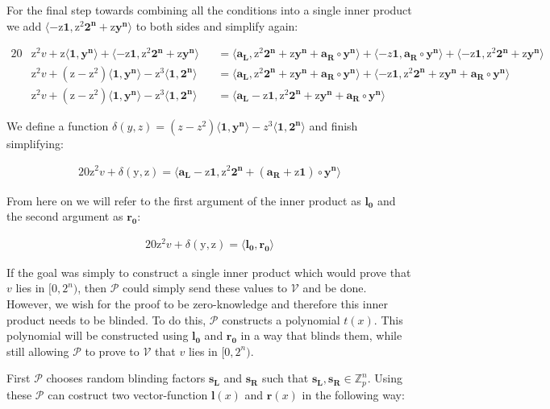 \documentclass{article}
\newcommand{\eq}[1]{\begin{alignat*}{20}#1\end{alignat*}}
\renewcommand{\vec}[1]{\boldsymbol{#1}}
\newcommand{\ran}[1]{\mathrm{#1}}
\newcommand{\vecran}[1]{\mathbf{#1}}
\newcommand{\V}{\mathcal{V}}
\renewcommand{\P}{\mathcal{P}}
\newcommand{\Z}{\mathbb{Z}}
\newcommand{\dotp}[2]{\langle #1, #2 \rangle}
\newcommand{\opn}[1]{\operatorname{#1}}
\newcommand{\vecl}[1]{\vec{#1_{\opn{L}}}}
\newcommand{\vecr}[1]{\vec{#1_{\opn{R}}}}
\begin{document}
For the final step towards combining all the conditions into a single
inner product we add $\dotp{-\ran{z}\vec{1}}{\ran{z^2}\vec{2^n} +
\ran{z}\vecran{y^n}}$ to both sides and simplify again:

\eq{
	&\ran{z^2}v + \ran{z}\dotp{\vec{1}}{\vecran{y^n}} + \dotp{-\ran{z}\vec{1}}{\ran{z^2}\vec{2^n} + \ran{z}\vecran{y^n}}
	&&= \dotp{\vecl{a}}{\ran{z^2}\vec{2^n} + \ran{z}\vecran{y^n} + \vecr{a}\circ \vecran{y^n}} +
	\dotp{-z\vec{1}}{\vecr{a}\circ\vecran{y^n}} + \dotp{-\ran{z}\vec{1}}{\ran{z^2}\vec{2^n} + \ran{z}\vecran{y^n}} \\ 
	&\ran{z^2}v + (\ran{z} - \ran{z^2})\dotp{\vec{1}}{\vecran{y^n}} - \ran{z^3}\dotp{\vec{1}}{\vec{2^n}} &&= \dotp{\vecl{a}}{\ran{z^2}\vec{2^n} + \ran{z}\vecran{y^n} + \vecr{a}\circ \vecran{y^n}} + \dotp{-\ran{z}\vec{1}}{\ran{z^2}\vec{2^n}+\ran{z}\vecran{y^n} + \vecr{a}\circ\vecran{y^n}}
	\\
	&\ran{z^2}v + (\ran{z} - \ran{z^2})\dotp{\vec{1}}{\vecran{y^n}} - \ran{z^3}\dotp{\vec{1}}{\vec{2^n}} &&= \dotp{\vecl{a}- \ran{z}\vec{1}}{\ran{z^2}\vec{2^n} + \ran{z}\vecran{y^n} + \vecr{a}\circ \vecran{y^n}}
}

We define a function $\delta(y,z) = (z - z^2)\dotp{\vec{1}}{\vec{y^n}}
- z^3\dotp{\vec{1}}{\vec{2^n}}$ and finish simplifying:

\eq{
	\ran{z^2}v + \delta(\ran{y},\ran{z}) = \dotp{\vecl{a} - \ran{z}\vec{1}}{\ran{z^2}\vec{2^n} + (\vecr{a} + \ran{z}\vec{1})\circ\vecran{y^n}}
}

From here on we will refer to the first argument of the inner product as $\vec{l_0}$ and the second argument as $\vec{r_0}$:

\eq{
	\ran{z^2}v + \delta(\ran{y},\ran{z}) = \dotp{\vec{l_0}}{\vec{r_0}}
}

If the goal was simply to construct a single inner product which
would prove that $v$ lies in $[0,2^n)$, then $\P$ could simply send
these values to $\V$ and be done. However, we wish for the proof to be
zero-knowledge and therefore this inner product needs to be blinded. To
do this, $\P$ constructs a polynomial $t(x)$. This polynomial will
be constructed using $\vec{l_0}$ and $\vec{r_0}$ in a way that blinds
them, while still allowing $\P$ to prove to $\V$ that $v$ lies in
$[0,2^n)$.

First $\P$ chooses random blinding factors $\vecran{s_L}$ and
$\vecran{s_R}$ such that $\vecl{s},\vecr{s}\in \Z^n_p$. Using these
$\P$ can costruct two vector-function $\vec{l}(x)$ and $\vec{r}(x)$
in the following way:
\end{document}

